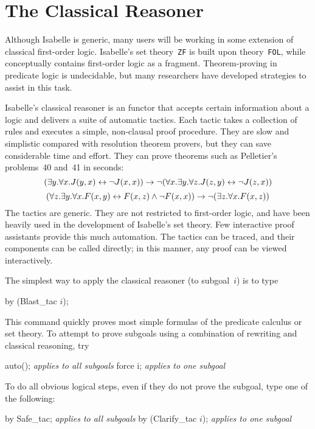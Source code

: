 \chapter{The Classical Reasoner}\label{chap:classical}
\newcommand\ainfer[2]{\begin{array}{r@{\,}l}#2\\ \hline#1\end{array}}

Although Isabelle is generic, many users will be working in some
extension of classical first-order logic.  
Isabelle's set theory~{\tt ZF} is built upon theory~\texttt{FOL}, 
while {\HOL} conceptually contains first-order logic as a fragment.
Theorem-proving in predicate logic is undecidable, but many
researchers have developed strategies to assist in this task.

Isabelle's classical reasoner is an \ML{} functor that accepts certain
information about a logic and delivers a suite of automatic tactics.  Each
tactic takes a collection of rules and executes a simple, non-clausal proof
procedure.  They are slow and simplistic compared with resolution theorem
provers, but they can save considerable time and effort.  They can prove
theorems such as Pelletier's~\cite{pelletier86} problems~40 and~41 in
seconds:
\[ (\exists y. \forall x. J(y,x) \leftrightarrow \neg J(x,x))  
   \rightarrow  \neg (\forall x. \exists y. \forall z. J(z,y) \leftrightarrow \neg J(z,x)) \]
\[ (\forall z. \exists y. \forall x. F(x,y) \leftrightarrow F(x,z) \wedge \neg F(x,x))
   \rightarrow \neg (\exists z. \forall x. F(x,z))  
\]
%
The tactics are generic.  They are not restricted to first-order logic, and
have been heavily used in the development of Isabelle's set theory.  Few
interactive proof assistants provide this much automation.  The tactics can
be traced, and their components can be called directly; in this manner,
any proof can be viewed interactively.

The simplest way to apply the classical reasoner (to subgoal~$i$) is to type
\begin{ttbox}
by (Blast_tac \(i\));
\end{ttbox}
This command quickly proves most simple formulas of the predicate calculus or
set theory.  To attempt to prove subgoals using a combination of
rewriting and classical reasoning, try
\begin{ttbox}
auto();                         \emph{\textrm{applies to all subgoals}}
force i;                        \emph{\textrm{applies to one subgoal}}
\end{ttbox}
To do all obvious logical steps, even if they do not prove the
subgoal, type one of the following:
\begin{ttbox}
by Safe_tac;                   \emph{\textrm{applies to all subgoals}}
by (Clarify_tac \(i\));            \emph{\textrm{applies to one subgoal}}
\end{ttbox}


